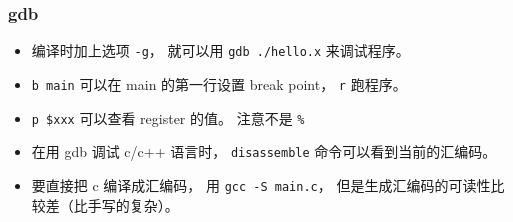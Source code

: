 \subsubsection{gdb}
\begin{itemize}
\item 编译时加上选项 \verb|-g|， 就可以用 \verb|gdb ./hello.x| 来调试程序。
\item \verb|b main| 可以在 main 的第一行设置 break point， \verb|r| 跑程序。
\item \verb|p $xxx| 可以查看 register 的值。 注意不是 \verb|%|
\item 在用 gdb 调试 c/c++ 语言时， \verb|disassemble| 命令可以看到当前的汇编码。
\item 要直接把 c 编译成汇编码， 用 \verb|gcc -S main.c|， 但是生成汇编码的可读性比较差（比手写的复杂）。
\end{itemize}

